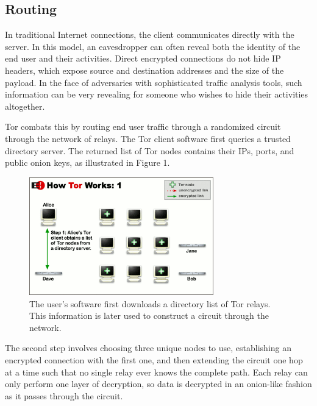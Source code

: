 \documentclass[journal]{IEEEtran}
\begin{document}
\subsection{Routing}

In traditional Internet connections, the client communicates directly with the server. In this model, an eavesdropper can often reveal both the identity of the end user and their activities. Direct encrypted connections do not hide IP headers, which expose source and destination addresses and the size of the payload. In the face of adversaries with sophisticated traffic analysis tools, such information can be very revealing for someone who wishes to hide their activities altogether.

Tor combats this by routing end user traffic through a randomized circuit through the network of relays. The Tor client software first queries a trusted directory server. The returned list of Tor nodes contains their IPs, ports, and public onion keys,\cite{Xin2009} as illustrated in Figure 1.

\begin{figure}[htbp]
\centering
\begin{minipage}{8 cm}
    \includegraphics[width=80mm]{resources/circuit-building-1.png}
    \caption{The user's software first downloads a directory list of Tor relays. This information is later used to construct a circuit through the network.\cite{McCoy2008}}
\end{minipage}
\end{figure}

The second step involves choosing three unique nodes to use, establishing an encrypted connection with the first one, and then extending the circuit one hop at a time such that no single relay ever knows the complete path. Each relay can only perform one layer of decryption, so data is decrypted in an onion-like fashion as it passes through the circuit.
\end{document}
